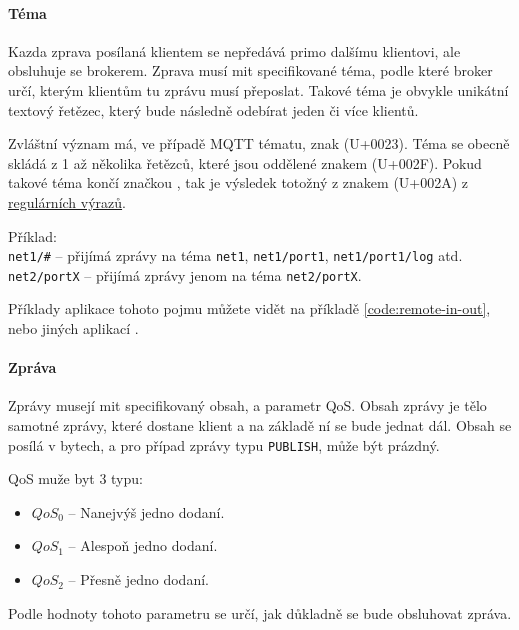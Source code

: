 \paragraph{Téma}
\label{par:topic}

Kazda zprava posílaná klientem se nepředává primo dalšímu klientovi, ale obsluhuje se brokerem. Zprava musí mit specifikované téma, podle které broker určí, kterým klientům tu zprávu musí přeposlat. Takové téma je obvykle unikátní textový řetězec, který bude následně odebírat jeden či více klientů.

Zvláštní význam má, ve případě MQTT tématu, znak \uv{\#} (U+0023). Téma se obecně skládá z 1 až několika řetězců, které jsou oddělené znakem \uv{/} (U+002F). Pokud takové téma končí značkou \uv{\#}, tak je výsledek totožný z  znakem \uv{*} (U+002A) z \href{https://en.wikipedia.org/wiki/Regular_expression}{regulárních výrazů}.

\begin{tabbing}
 Příklad: \= \\
 \> \texttt{net1/\#} -- přijímá zprávy na téma \texttt{net1}, \texttt{net1/port1}, \texttt{net1/port1/log} atd.\\
 \> \texttt{net2/portX} -- přijímá zprávy jenom na téma \texttt{net2/portX}. \\
\end{tabbing}

Příklady aplikace tohoto pojmu můžete vidět na příkladě \ref{code:remote-in-out}, nebo jiných aplikací \todo{}.

\paragraph{Zpráva}
\label{par:message}

Zprávy musejí mit specifikovaný obsah, a parametr QoS. Obsah zprávy je tělo samotné zprávy, které dostane klient a na základě ní se bude jednat dál. Obsah se posílá v bytech, a pro případ zprávy typu \texttt{PUBLISH}, může být prázdný.

QoS muže byt 3 typu:
\begin{itemize}
  \item $QoS_0$ -- Nanejvýš jedno dodaní.
  \item $QoS_1$ -- Alespoň jedno dodaní.
  \item $QoS_2$ -- Přesně jedno dodaní.
\end{itemize}

Podle hodnoty tohoto parametru se určí, jak důkladně se bude obsluhovat zpráva.

